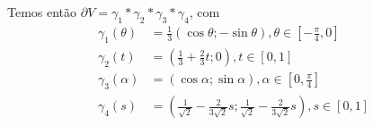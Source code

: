 \documentclass[12pt,a4paper]{article}
\begin{document}
\begin{enumerate}
\begin{enumerate}[a)]
\begin{figure*}[h!]
	\end{figure*}
\par Temos então $\partial V = \gamma_1*\gamma_2*\gamma_3*\gamma_4$, com
\begin{align*}
\gamma_1(\theta) &= \frac{1}{3}\left( \cos\theta; -\sin\theta \right), \theta\in\left[-\frac{\pi}{4},0\right] \\
\gamma_2(t) &= \left(\frac{1}{3} + \frac{2}{3}t;0 \right), t\in[0,1] \\
\gamma_3(\alpha) &= (\cos\alpha; \sin\alpha), \alpha\in\left[ 0,\frac{\pi}{4} \right] \\
\gamma_4(s) &= \left(\frac{1}{\sqrt{2}} -\frac{2}{3\sqrt{2}}s;\frac{1}{\sqrt{2}} -\frac{2}{3\sqrt{2}}s \right), s\in[0,1] 
\end{align*}
	
	
\end{enumerate}

\end{enumerate}
	
\end{document}
